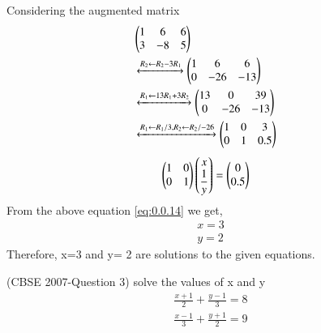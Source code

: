 \documentclass[journal,12pt,twocolumn]{IEEEtran}
\begin{document}
Considering the augmented matrix 
 \begin{align}
  &\begin{pmatrix}1&6&6\\3&-8&5\end{pmatrix}&\\ 
& \xleftrightarrow[]{ R_2 \leftarrow R_2 - 3R_1}
  \begin{pmatrix}1&6&6\\0&-26&-13\end{pmatrix}&\\
  & \xleftrightarrow[]{ R_1 \leftarrow 13R_1 + 3R_2}
  \begin{pmatrix}13&0&39\\0&-26&-13\end{pmatrix}&\\
   & \xleftrightarrow[]{ R_1 \leftarrow R_1/3,R_2 \leftarrow R_2/-26}
  \begin{pmatrix}1&0&3\\0&1&0.5\end{pmatrix}&
 \end{align}
 \begin{align}
&\myvec{1&0\\0&1} \myvec{x\\\displaystyle\frac{1}{y}}= \myvec{0\\0.5}& \label{eq:0.0.14}
\medskip
\end{align}
From the above equation \eqref{eq:0.0.14} we get,
\begin{align}
&x=3&\\
&y=2&
\end{align}
Therefore, x=3 and y= 2 are solutions to the given equations.
\bigskip
\item (CBSE 2007-Question 3)
solve the values of x and y
\begin{align}
\displaystyle\frac{x+1}{2}+\displaystyle\frac{y-1}{3}=8\\
\displaystyle\frac{x-1}{3}+\displaystyle\frac{y+1}{2}=9\end{align}
\end{document}
